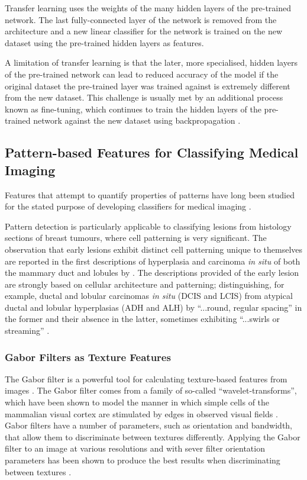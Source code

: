 Transfer learning uses the weights of the many hidden layers of the pre-trained network. The last fully-connected layer of the network is removed from the architecture and a new linear classifier for the network is trained on the new dataset using the pre-trained hidden layers as features.\par

A limitation of transfer learning is that the later, more specialised, hidden layers of the pre-trained network can lead to reduced accuracy of the model if the original dataset the pre-trained layer was trained against is extremely different from the new dataset. This challenge is usually met by an additional process known as fine-tuning, which continues to train the hidden layers of the pre-trained network against the new dataset using backpropagation \citep{yosinski2014}.\par

\subsection{Pattern-based Features for Classifying Medical Imaging}

Features that attempt to quantify properties of patterns have long been studied for the stated purpose of developing classifiers for medical imaging \citep{wolberg1990,meyer2004}.

Pattern detection is particularly applicable to classifying lesions from histology sections of breast tumours, where cell patterning is very significant. The observation that early lesions exhibit distinct cell patterning unique to themselves are reported in the first descriptions of hyperplasia and carcinoma \textit{in situ} of both the mammary duct and lobules by \cite{page1982}. The descriptions provided of the early lesion are strongly based on cellular architecture and patterning; distinguishing, for example, ductal and lobular carcinomas \emph{in situ} (DCIS and LCIS) from atypical ductal and lobular hyperplasias  (ADH and ALH) by ``...round, regular spacing''  in the former and their absence in the latter, sometimes exhibiting ``...swirls or streaming'' \cite{page1982}.\par

\subsubsection{Gabor Filters as Texture Features}
The Gabor filter is a powerful tool for calculating texture-based features from images \citep{fan1993}. The Gabor filter comes from a family of so-called ``wavelet-transforms'', which have been shown to model the manner in which simple cells of the mammalian visual cortex are stimulated by edges in observed visual fields \citep{marcelja1980}. Gabor filters have a number of parameters, such as orientation and bandwidth, that allow them to discriminate between textures differently. Applying the Gabor filter to an image at various resolutions and with sever filter orientation parameters has been shown to produce the best results when discriminating between textures \citep{unser1995}.

